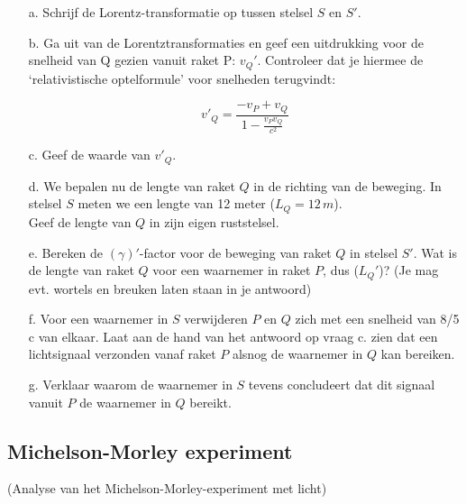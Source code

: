		\begin{enumerate}
			\item[a.]
			Schrijf de Lorentz-transformatie op tussen stelsel $S$ en $S'$.
			
				\item[b.]
				Ga uit van de Lorentztransformaties en geef een uitdrukking voor de snelheid van Q gezien vanuit raket P: $v_Q'$. Controleer dat je
hiermee de `relativistische optelformule' voor snelheden terugvindt:
			
			\begin{equation}
				v'_Q = \frac{-v_P + v_Q}{1-\frac{v_P v_Q}{c^2}}
				\label{eq:1}
			\end{equation}
			
			\item[c.]
			Geef de waarde van $v'_Q$.
			
			\item[d.]
			We bepalen nu de lengte van raket $Q$ in de richting van de beweging.
			In stelsel $S$ meten we een lengte van 12 meter ($L_Q=12\,m$).\\
			Geef de lengte van $Q$ in zijn eigen ruststelsel. 
	  	
	  	\item[e.]
  		 Bereken de $(\gamma)'$-factor voor de beweging van raket $Q$ in stelsel $S'$. Wat is de lengte van raket $Q$ voor een waarnemer in raket $P$, dus ($L_Q'$)? (Je mag evt. wortels en breuken laten staan in je antwoord)
			
			\item[f.]
			 Voor een
waarnemer in $S$ verwijderen $P$ en $Q$ zich met een snelheid van 8/5 c van
elkaar. Laat aan de hand van het antwoord op vraag c. zien dat een lichtsignaal verzonden vanaf raket $P$ alsnog de waarnemer in $Q$ kan bereiken.
			\item[g.]
			Verklaar waarom de waarnemer in $S$ tevens concludeert dat dit signaal vanuit $P$ de waarnemer in $Q$ bereikt.
			
		\end{enumerate}

\subsection{Michelson-Morley experiment}
(Analyse van het Michelson-Morley-experiment met licht)


